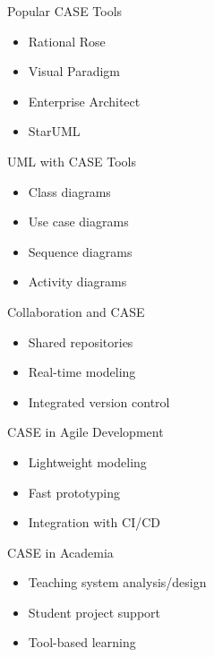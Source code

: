 \documentclass[aspectratio=169]{beamer}
\begin{document}
\begin{frame}{Popular CASE Tools}
  \begin{itemize}
    \item Rational Rose
    \item Visual Paradigm
    \item Enterprise Architect
    \item StarUML
  \end{itemize}
\end{frame}

\begin{frame}{UML with CASE Tools}
  \begin{itemize}
    \item Class diagrams
    \item Use case diagrams
    \item Sequence diagrams
    \item Activity diagrams
  \end{itemize}
\end{frame}

\begin{frame}{Collaboration and CASE}
  \begin{itemize}
    \item Shared repositories
    \item Real-time modeling
    \item Integrated version control
  \end{itemize}
\end{frame}

\begin{frame}{CASE in Agile Development}
  \begin{itemize}
    \item Lightweight modeling
    \item Fast prototyping
    \item Integration with CI/CD
  \end{itemize}
\end{frame}

\begin{frame}{CASE in Academia}
  \begin{itemize}
    \item Teaching system analysis/design
    \item Student project support
    \item Tool-based learning
  \end{itemize}
\end{frame}
\end{document}
